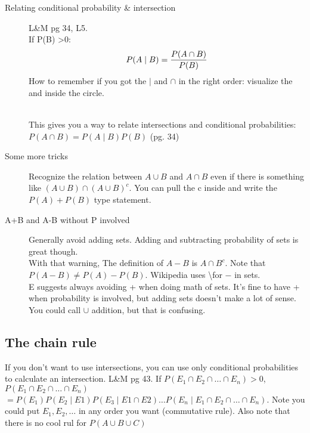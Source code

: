 \begin{description}
\item[Relating conditional probability \& intersection]     L\&M pg 34, L5. \hfill \\
If P(B) \textgreater 0:
	\begin{align*}
		P(A \mid B) = \frac{ P(A \cap B) }{ P(B) }   \hfill \\
	\end{align*}
How to remember if you got the $\mid$ and $\cap$ in the right order: visualize the and inside the circle.

\hfill \\
This gives you a way to relate intersections and conditional probabilities:
$P(A \cap B) = P(A \mid B)P(B)$  (pg. 34)

\item[Some more tricks]
	Recognize the relation between $A \cup B$  and $A \cap B$ even if there is something like $(A \cup B) \cap (A \cup B)^c$.  You can pull the c inside and write the $P(A) + P(B)$ type statement.
	
\item[A+B and A-B without P involved]
Generally avoid adding sets.  Adding and subtracting probability of sets is great though. \hfill \\
With that warning, The definition of $A-B$ is $A \cap B^c$.  Note that $P(A-B) \neq P(A) - P(B)$.  Wikipedia uses \textbackslash  for $-$ in sets. \hfill \\ 
E suggests always avoiding + when doing math of sets.  It's fine to have + when probability is involved, but adding sets doesn't make a lot of sense.  You could call $\cup$ addition, but that is confusing.  
\end{description}

\subsection{The chain rule}
If you don't want to use intersections, you can use only conditional probabilities to calculate an intersection.  {\tiny L\&M pg 43.}
If $P(E_1 \cap E_2 \cap \dots \cap E_n) > 0$, \hfill \\
$P(E_1 \cap E_2 \cap \dots \cap E_n)$  \hfill \\ 
$= P(E_1)P(E_2 \mid E1)P(E_3 \mid E1 \cap E2) \dots P(E_n \mid E_1 \cap E_2 \cap \dots \cap E_n)$.
 Note you could put $E_1, E_2, \dots$ in any order you want (commutative rule).  Also note that there is no cool rul for $P(A \cup B \cup C)$  \hfill \\ \hfill \\ 
 
